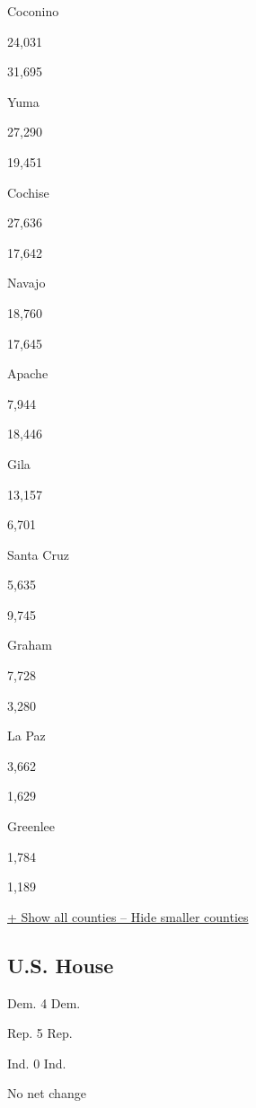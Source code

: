 Coconino

24,031

31,695

Yuma

27,290

19,451

Cochise

27,636

17,642

Navajo

18,760

17,645

Apache

7,944

18,446

Gila

13,157

6,701

Santa Cruz

5,635

9,745

Graham

7,728

3,280

La Paz

3,662

1,629

Greenlee

1,784

1,189

\protect\hyperlink{}{+ Show all counties -- Hide smaller counties}

\hypertarget{us-house}{%
\subsection{U.S. House}\label{us-house}}

Dem. 4 Dem.

Rep. 5 Rep.

Ind. 0 Ind.

No net change

